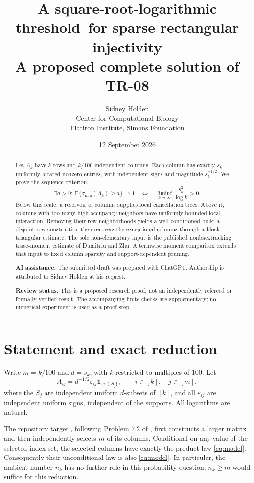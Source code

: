 \documentclass[11pt]{article}
\title{A square-root-logarithmic threshold\ for sparse rectangular injectivity\\[5pt]
  \large A proposed complete solution of TR-08}
\author{Sidney Holden\\[3pt]\small Center for Computational Biology\\\small Flatiron Institute, Simons Foundation}
\date{12 September 2026}
\theoremstyle{definition}
\theoremstyle{remark}
\newcommand{\PP}{\mathbb P}
\newcommand{\smin}{\sigma_{\min}}
\newcommand{\ind}{\mathbf 1}
\begin{document}
\maketitle
\begin{abstract}
Let $A_k$ have $k$ rows and $k/100$ independent columns. Each column has exactly $s_k$ uniformly located nonzero entries, with independent signs and magnitude $s_k^{-1/2}$. We prove the sequence criterion
\[
 \exists a>0:\ \PP\{\smin(A_k)\geq a\}\longrightarrow1
 \quad\Longleftrightarrow\quad
 \liminf_{k\to\infty}\frac{s_k^2}{\log k}>0.
\]
Below this scale, a reservoir of columns supplies local cancellation trees. Above it, columns with too many high-occupancy neighbors have uniformly bounded local interaction. Removing their row neighborhoods yields a well-conditioned bulk; a disjoint-row construction then recovers the exceptional columns through a block-triangular estimate. The sole non-elementary input is the published nonbacktracking trace-moment estimate of Dumitriu and Zhu. A termwise moment comparison extends that input to fixed column sparsity and support-dependent pruning.

\smallskip
\noindent\textbf{AI assistance.} The submitted draft was prepared with ChatGPT. Authorship is attributed to Sidney Holden at his request.\par
\noindent\textbf{Review status.} This is a proposed research proof, not an independently refereed or formally verified result. The accompanying finite checks are supplementary; no numerical experiment is used as a proof step.
\end{abstract}

\section{Statement and exact reduction}

Write $m=k/100$ and $d=s_k$, with $k$ restricted to multiples of $100$. Let
\begin{equation}\label{eq:model}
 A_{ij}=d^{-1/2}\varepsilon_{ij}\ind_{\{i\in S_j\}},
 \qquad i\in[k],\quad j\in[m],
\end{equation}
where the $S_j$ are independent uniform $d$-subsets of $[k]$, and all $\varepsilon_{ij}$ are independent uniform signs, independent of the supports. All logarithms are natural.

The repository target \cite{TR08}, following Problem 7.2 of \cite{HRT}, first constructs a larger matrix and then independently selects $m$ of its columns. Conditional on any value of the selected index set, the selected columns have exactly the product law \eqref{eq:model}. Consequently their unconditional law is also \eqref{eq:model}. In particular, the ambient number $n_k$ has no further role in this probability question; $n_k\geq m$ would suffice for this reduction.
\end{document}
